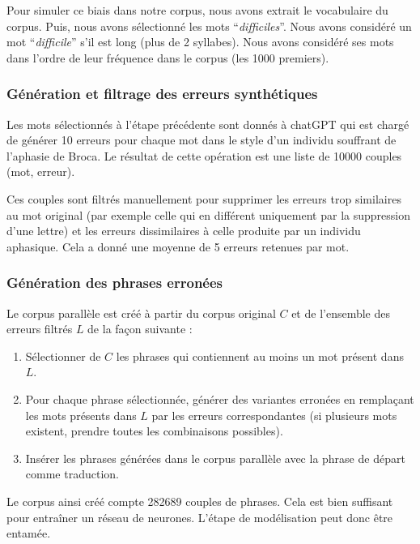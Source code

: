 Pour simuler ce biais dans notre corpus, nous avons extrait le vocabulaire du corpus.
Puis, nous avons sélectionné les mots ``\emph{difficiles}''. 
Nous avons considéré un mot ``\emph{difficile}'' s'il est long (plus de 2 syllabes).
Nous avons considéré ses mots dans l'ordre de leur fréquence dans le corpus (les 1000 premiers).

\subsubsection{Génération et filtrage des erreurs synthétiques}

Les mots sélectionnés à l'étape précédente sont donnés à chatGPT 
qui est chargé de générer 10 erreurs pour chaque mot dans le style d'un individu souffrant de l'aphasie de Broca.
Le résultat de cette opération est une liste de 10000 couples (mot, erreur).

Ces couples sont filtrés manuellement pour supprimer les erreurs trop similaires au mot original 
(par exemple celle qui en différent uniquement par la suppression d'une lettre)
et les erreurs dissimilaires à celle produite par un individu aphasique.
Cela a donné une moyenne de 5 erreurs retenues par mot.

\subsubsection{Génération des phrases erronées}

Le corpus parallèle est créé à partir du corpus original \(C\) et de l'ensemble des erreurs filtrés \(L\) 
de la façon suivante :

\begin{enumerate}
    \item Sélectionner de \(C\) les phrases qui contiennent au moins un mot présent dans \(L\).
    \item Pour chaque phrase sélectionnée, générer des variantes erronées en remplaçant les mots présents dans \(L\)
    par les erreurs correspondantes (si plusieurs mots existent, prendre toutes les combinaisons possibles).
    \item Insérer les phrases générées dans le corpus parallèle avec la phrase de départ comme traduction.
\end{enumerate}

Le corpus ainsi créé compte 282689 couples de phrases.
Cela est bien suffisant pour entraîner un réseau de neurones.
L'étape de modélisation peut donc être entamée.
